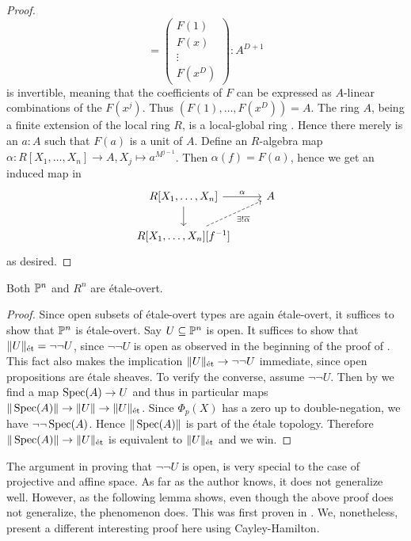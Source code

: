 \begin{proof}
\[    =
    \begin{pmatrix}
      F(1) \\
      F(x) \\
      \vdots\\
      F(x^D)
    \end{pmatrix}
    : A^{D+1}
  \]
  is invertible, meaning that the coefficients of $F$ can be expressed as $A$-linear combinations of the $F(x^j)$.
  Thus $(F(1), \hdots, F(x^D)) = A$.
  The ring $A$, being a finite extension of the local ring $R$, is a local-global ring \cite[Chapter IX, Theorem 6.13]{lombardi-quitte}.
  Hence there merely is an $a:A$ such that $F(a)$ is a unit of $A$.
  Define an $R$-algebra map $\alpha : R[X_1, \hdots, X_n] \to A, X_j \mapsto a^{M^{j-1}}$.
  Then $\alpha(f) = F(a)$, hence we get an induced map in
  \[
    \begin{tikzcd}
      R[X_1, \hdots, X_n] \ar[r, "\alpha"] \ar[d] & A \\
      R[X_1, \hdots, X_n][f^{-1}] \ar[ur, "\exists !\overline{\alpha}"', dashed] &
    \end{tikzcd}
  \]
  as desired.

\end{proof}

\begin{corollary}
  \label{R^n-etale-overt}
  Both $\bP^n$ and $R^n$ are étale-overt.
\end{corollary}

\begin{proof}
  Since open subsets of étale-overt types are again étale-overt, it suffices to show that $\bP^n$ is étale-overt.
  Say $U \subseteq \bP^n$ is open.
  It suffices to show that $\|U\|_\et = \neg\neg U$, since $\neg\neg U$ is open as observed in the beginning of the proof of .
  This fact also makes the implication $\|U\|_\et \to \neg\neg U$ immediate, since open propositions are étale sheaves.
  To verify the converse, assume $\neg\neg U$. Then by  we find a map $\Spec(A) \to U$ and thus in particular maps $\|\Spec(A)\| \to \|U\| \to \|U\|_\et$.
  Since $\Phi_p(X)$ has a zero up to double-negation, we have $\neg\neg\Spec(A)$.
  Hence $\|\Spec(A)\|$ is part of the étale topology.
  Therefore $\|\Spec(A)\| \to \|U\|_\et$ is equivalent to $\|U\|_\et$ and we win.
\end{proof}

The argument in  proving that $\neg\neg U$ is open, is very special to the case of projective and affine space.
As far as the author knows, it does not generalize well.
However, as the following lemma shows, even though the above proof does not generalize, the phenomenon does.
This was first proven in \cite[Lemma 1.1.7]{étale-sheaves-compendium}.
We, nonetheless, present a different interesting proof here using Cayley-Hamilton.

